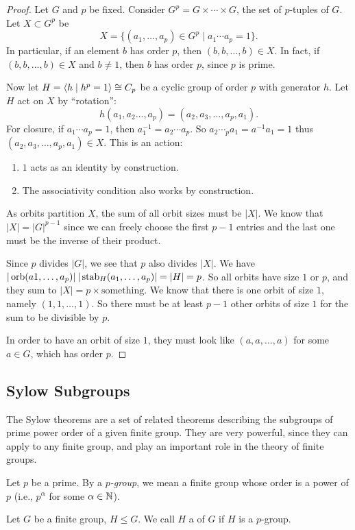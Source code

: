 \begin{proof}
Let $G$ and $p$ be fixed. Consider $G^p=G\times\cdots\times G$, the set of $p$-tuples of $G$. Let $X\subset G^p$ be
\[X=\{(a_1,\dots,a_p)\in G^p\mid a_1\cdots a_p=1\}.\]
In particular, if an element $b$ has order $p$, then $(b,b,\dots,b)\in X$. In fact, if $(b,b,\dots,b)\in X$ and $b\neq 1$, then $b$ has order $p$, since $p$ is prime.

Now let $H=\left\langle h\mid h^p=1\right\rangle\cong C_p$ be a cyclic group of order $p$ with generator $h$. Let $H$ act on $X$ by ``rotation'':
\[h(a_1,a_2\dots,a_p)=(a_2,a_3,\dots,a_p,a_1).\]
For closure, if $a_1\cdots a_p=1$, then $a_1^{-1}=a_2\cdots a_p$. So $a_2\cdots _p a_1=a^{-1}a_1=1$ thus $(a_2,a_3,\dots,a_p,a_1)\in X$.
This is an action:
\begin{enumerate}[label=(\roman*)]
\item $1$ acts as an identity by construction.
\item The associativity condition also works by construction.
\end{enumerate}

As orbits partition $X$, the sum of all orbit sizes must be $|X|$. We know that $|X|=|G|^{p-1}$ since we can freely choose the first $p-1$ entries and the last one must be the inverse of their product. 

Since $p$ divides $|G|$, we see that $p$ also divides $|X|$. We have $|\operatorname{orb}(a1,\dots,a_p)|\:|\operatorname{stab}_H(a_1,\dots,a_p)|=|H|=p$. So all orbits have size $1$ or $p$, and they sum to $|X|=p\times\text{something}$. We know that there is one orbit of size $1$, namely $(1,1,\dots,1)$. So there must be at least $p-1$ other orbits of size $1$ for the sum to be divisible by $p$.

In order to have an orbit of size $1$, they must look like $(a,a,\dots,a)$ for some $a\in G$, which has order $p$.
\end{proof}

\subsection{Sylow Subgroups}
The Sylow theorems are a set of related theorems describing the subgroups of prime power order of a given finite group. They are very powerful, since they can apply to any finite group, and play an important role in the theory of finite groups.

\begin{definition}
Let $p$ be a prime. By a \emph{$p$-group}, we mean a finite group whose order is a power of $p$ (i.e., $p^\alpha$ for some $\alpha\in\mathbb N$).

Let $G$ be a finite group, $H\le G$. We call $H$ a  of $G$ if $H$ is a $p$-group. 
\end{definition}

